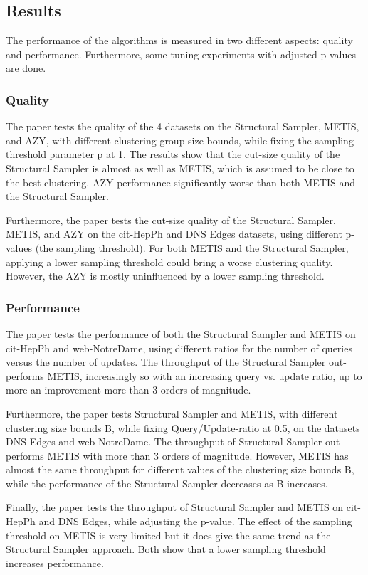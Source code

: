 \documentclass[a4paper,11pt]{article}
\begin{document}
\subsection{Results}
The performance of the algorithms is measured in two different aspects: quality and performance. Furthermore, some tuning experiments with adjusted p-values are done.

\subsubsection{Quality}
The paper tests the quality of the 4 datasets on the Structural Sampler, METIS, and AZY, with different clustering group size bounds, while fixing the sampling threshold parameter p at 1. The results show that the cut-size quality of the Structural Sampler is almost as well as METIS, which is assumed to be close to the best clustering. AZY performance significantly worse than both METIS and the Structural Sampler.

Furthermore, the paper tests the cut-size quality of the Structural Sampler, METIS, and AZY on the cit-HepPh and DNS Edges datasets, using different p-values (the sampling threshold).
For both METIS and the Structural Sampler, applying a lower sampling threshold could bring a worse clustering quality. However, the AZY is mostly uninfluenced by a lower sampling threshold. 

\subsubsection{Performance}
The paper tests the performance of both the Structural Sampler and METIS on cit-HepPh and web-NotreDame, using different ratios for the number of queries versus the number of updates. 
The throughput of the Structural Sampler out-performs METIS, increasingly so with an increasing query vs. update ratio, up to more an improvement more than 3 orders of magnitude.

Furthermore, the paper tests Structural Sampler and METIS, with different clustering size bounds B, while fixing Query/Update-ratio at 0.5, on the datasets DNS Edges and web-NotreDame.
The throughput of Structural Sampler out-performs METIS with more than 3 orders of magnitude. However, METIS has almost the same throughput for different values of the clustering size bounds B, while the performance of the Structural Sampler decreases as B increases. 

Finally, the paper tests the throughput of Structural Sampler and METIS on cit-HepPh and DNS Edges, while adjusting the p-value. 
The effect of the sampling threshold on METIS is very limited but it does give the same trend as the Structural Sampler approach. Both show that a lower sampling threshold increases performance. 
\end{document}

